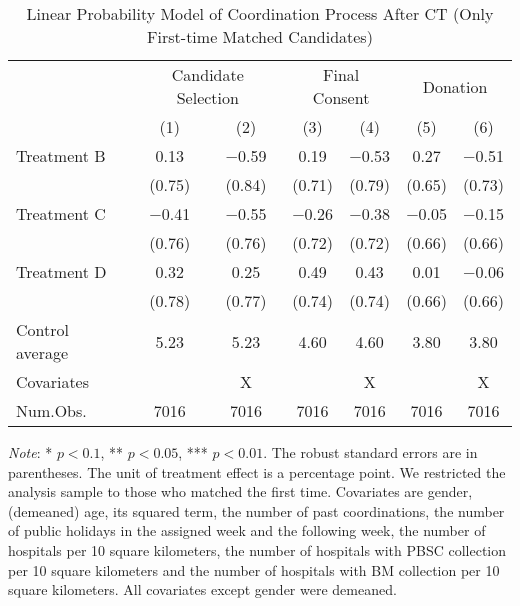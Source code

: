 \documentclass[12pt, a4paper]{article}
\begin{document}
\begin{table}[H]

\caption{\label{tab:lm-coordinate-initial}Linear Probability Model of Coordination Process After CT (Only First-time Matched Candidates)}
\centering
\fontsize{8}{10}\selectfont
\begin{threeparttable}
\begin{tabular}[t]{lcccccc}
\toprule
\multicolumn{1}{c}{ } & \multicolumn{2}{c}{Candidate Selection} & \multicolumn{2}{c}{Final Consent} & \multicolumn{2}{c}{Donation} \\
\cmidrule(l{3pt}r{3pt}){2-3} \cmidrule(l{3pt}r{3pt}){4-5} \cmidrule(l{3pt}r{3pt}){6-7}
  & (1) & (2) & (3) & (4) & (5) & (6)\\
\midrule
Treatment B & \num{0.13} & \num{-0.59} & \num{0.19} & \num{-0.53} & \num{0.27} & \num{-0.51}\\
 & (\num{0.75}) & (\num{0.84}) & (\num{0.71}) & (\num{0.79}) & (\num{0.65}) & (\num{0.73})\\
Treatment C & \num{-0.41} & \num{-0.55} & \num{-0.26} & \num{-0.38} & \num{-0.05} & \num{-0.15}\\
 & (\num{0.76}) & (\num{0.76}) & (\num{0.72}) & (\num{0.72}) & (\num{0.66}) & (\num{0.66})\\
Treatment D & \num{0.32} & \num{0.25} & \num{0.49} & \num{0.43} & \num{0.01} & \num{-0.06}\\
 & (\num{0.78}) & (\num{0.77}) & (\num{0.74}) & (\num{0.74}) & (\num{0.66}) & (\num{0.66})\\
\midrule
Control average & 5.23 & 5.23 & 4.60 & 4.60 & 3.80 & 3.80\\
Covariates &  & X &  & X &  & X\\
Num.Obs. & \num{7016} & \num{7016} & \num{7016} & \num{7016} & \num{7016} & \num{7016}\\
\bottomrule
\end{tabular}
\begin{tablenotes}
\item \emph{Note}: * $p < 0.1$, ** $p < 0.05$, *** $p < 0.01$. The robust standard errors are in parentheses. The unit of treatment effect is a percentage point. We restricted the analysis sample to those who matched the first time. Covariates are gender, (demeaned) age, its squared term, the number of past coordinations, the number of public holidays in the assigned week and the following week, the number of hospitals per 10 square kilometers, the number of hospitals with PBSC collection per 10 square kilometers and the number of hospitals with BM collection per 10 square kilometers. All covariates except gender were demeaned.
\end{tablenotes}
\end{threeparttable}
\end{table}
\end{document}
